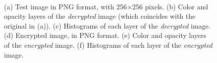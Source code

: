 \begin{figure}[htbp]
~
~
\caption{(a) Test image in PNG format, with 256$ \times $256 pixels. (b) Color and opacity layers of the \textit{decrypted} image (which coincides with the original in (a)). (c) Histograms of each layer of the \textit{decrypted} image. (d) Encrypted image, in PNG format. (e) Color and opacity layers of the \textit{encrypted} image. (f) Histograms of each layer of the \textit{encrypted} image.}
\label{fig:testing_hist}
\end{figure}

